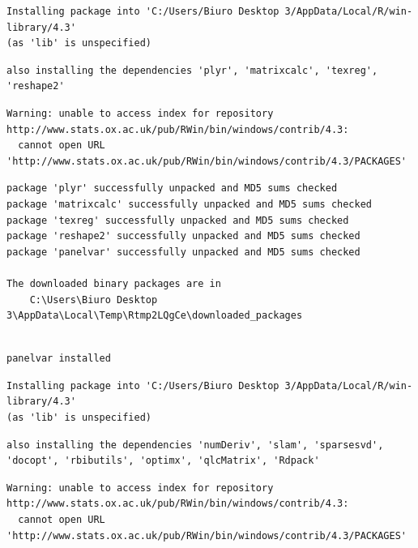 \documentclass[
  11pt,
]{article}
\begin{document}
\begin{verbatim}
Installing package into 'C:/Users/Biuro Desktop 3/AppData/Local/R/win-library/4.3'
(as 'lib' is unspecified)
\end{verbatim}

\begin{verbatim}
also installing the dependencies 'plyr', 'matrixcalc', 'texreg', 'reshape2'
\end{verbatim}

\begin{verbatim}
Warning: unable to access index for repository http://www.stats.ox.ac.uk/pub/RWin/bin/windows/contrib/4.3:
  cannot open URL 'http://www.stats.ox.ac.uk/pub/RWin/bin/windows/contrib/4.3/PACKAGES'
\end{verbatim}

\begin{verbatim}
package 'plyr' successfully unpacked and MD5 sums checked
package 'matrixcalc' successfully unpacked and MD5 sums checked
package 'texreg' successfully unpacked and MD5 sums checked
package 'reshape2' successfully unpacked and MD5 sums checked
package 'panelvar' successfully unpacked and MD5 sums checked

The downloaded binary packages are in
    C:\Users\Biuro Desktop 3\AppData\Local\Temp\Rtmp2LQgCe\downloaded_packages
\end{verbatim}

\begin{verbatim}

panelvar installed
\end{verbatim}

\begin{verbatim}
Installing package into 'C:/Users/Biuro Desktop 3/AppData/Local/R/win-library/4.3'
(as 'lib' is unspecified)
\end{verbatim}

\begin{verbatim}
also installing the dependencies 'numDeriv', 'slam', 'sparsesvd', 'docopt', 'rbibutils', 'optimx', 'qlcMatrix', 'Rdpack'
\end{verbatim}

\begin{verbatim}
Warning: unable to access index for repository http://www.stats.ox.ac.uk/pub/RWin/bin/windows/contrib/4.3:
  cannot open URL 'http://www.stats.ox.ac.uk/pub/RWin/bin/windows/contrib/4.3/PACKAGES'
\end{verbatim}
\end{document}
